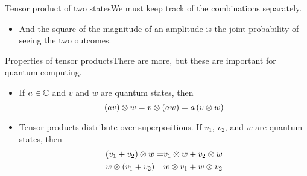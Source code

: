 \begin{frame}{Tensor product of two states}{We must keep track of the combinations separately.}
{{\begin{itemize}
    \item And the square of the magnitude of an amplitude is the joint probability of seeing the two outcomes.
\end{itemize}
}
}{%
}
\end{frame}

\begin{frame}{Properties of tensor products}{There are more, but these are important for quantum computing.}
\begin{itemize}
    \item If $a \in \mathbb{C}$ and $v$ and $w$ are quantum states, then
    \[ 
       (av)\otimes w = v\otimes (aw) = a\,(v\otimes w)
    \]
    \item Tensor products distribute over superpositions.  If $v_{1}$, $v_{2}$, and $w$ are quantum states, then
    \begin{align*}
       (v_{1}+v_{2})\otimes w = & v_{1}\otimes w + v_{2}\otimes w \\
       w\otimes (v_{1}+v_{2}) = & w\otimes v_{1} + w\otimes v_{2}
    \end{align*}
\end{itemize}
\end{frame}


